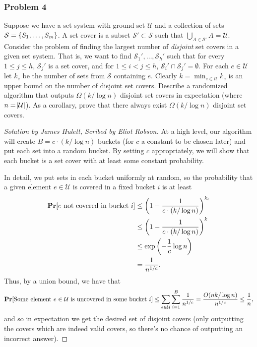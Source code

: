 \documentclass{article}
\newenvironment{scribed}[2]{\begin{proof}[Solution by #1, Scribed by #2]}{\end{proof}}
\begin{document}
\subsubsection{Problem 4}
Suppose we have a set system with ground set \(\mathcal{U}\) and a collection of sets \(\mathcal{S} = \set{S_1, \dots, S_m}\). A set cover is a subset \(\mathcal{S}' \subset \mathcal{S}\) such that \(\bigcup_{A \in \mathcal{S}'} A = \mathcal{U}\). Consider the problem of finding the largest number of \emph{disjoint} set covers in a given set system. That is, we want to find \(\mathcal{S}_1', \dots, \mathcal{S}_h'\) such that for every \(1 \leq j \leq h\), \(\mathcal{S}_j'\) is a set cover, and for \(1 \leq i < j \leq h\), \(\mathcal{S}_i' \cap \mathcal{S}_j' = \emptyset\). For each \(e \in \mathcal{U}\) let \(k_e\) be the number of sets from \(\mathcal{S}\) containing \(e\). Clearly \(k = \min_{e \in \mathcal{U}} k_e\) is an upper bound on the number of disjoint set covers. Describe a randomized algorithm that outputs \(\Omega(k / \log n)\) disjoint set covers in expectation (where \(n = \abs{\mathcal{U}}\)). As a corollary, prove that there always exist \(\Omega(k / \log n)\) disjoint set covers.

\begin{scribed}{James Hulett}{Eliot Robson}
    At a high level, our algorithm will create \(B = c \cdot (k / \log n)\) buckets (for \(c\) a constant to be chosen later) and put each set into a random bucket. By setting \(c\) appropriately, we will show that each bucket is a set cover with at least some constant probability.
    
    In detail, we put sets in each bucket uniformly at random, so the probability that a given element \(e \in \mathcal{U}\) is covered in a fixed bucket \(i\) is at least
    \begin{align*}
    	\Prob{e \text{ not covered in bucket } i}
    	&\leq%
    	\del{1 - \frac{1}{c \cdot (k / \log n)}}^{k_e}\\
    	&\leq%
    	\del{1 - \frac{1}{c \cdot (k / \log n)}}^{k}\\
    	&\leq%
    	\exp \del{- \frac{1}{c} \log n}\\
    	&=%
    	\frac{1}{n^{1 / c}}.
    \end{align*}
	Thus, by a union bound, we have that
	\[
		\Prob{\text{Some element \(e \in \mathcal{U}\) is uncovered in some bucket \(i\)}}
		\leq%
		\sum_{e \in \mathcal{U}} \sum_{i = 1}^{B} \frac{1}{n^{1/c}}
		=%
		\frac{O(n k / \log n)}{n^{1/c}}
		\leq%
		\frac{1}{n},
	\]
	and so in expectation we get the desired set of disjoint covers (only outputting the covers which are indeed valid covers, so there's no chance of outputting an incorrect answer).
\end{scribed}
\end{document}

